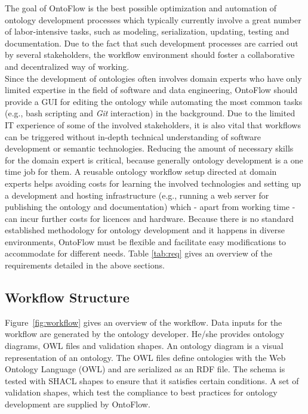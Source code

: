 \documentclass[runningheads]{llncs}
\begin{document}
The goal of OntoFlow is the best possible optimization and automation of ontology development processes which typically currently involve a great number of labor-intensive tasks, such as modeling, serialization, updating, testing and documentation. Due to the fact that such development processes are carried out by several stakeholders, the workflow environment should foster a collaborative and decentralized way of working.\\
Since the development of ontologies often involves domain experts who have only limited expertise in the field of software and data engineering, OntoFlow should provide a GUI for editing the ontology while automating the most common tasks (e.g., bash scripting and \textit{Git} interaction) in the background. Due to the limited IT experience of some of the involved stakeholders, it is also vital that workflows can be triggered without in-depth technical understanding of software development or semantic technologies. Reducing the amount of necessary skills for the domain expert is critical, because generally ontology development is a one time job for them. A reusable ontology workflow setup directed at domain experts helps avoiding costs for learning the involved technologies and setting up a development and hosting infrastructure (e.g., running a web server for publishing the ontology and documentation) which - apart from working time - can incur further costs for licences and hardware. Because there is no standard established methodology for ontology development and it happens in diverse environments, OntoFlow must be flexible and facilitate easy modifications to accommodate for different needs. Table \ref{tab:req} gives an overview of the requirements detailed in the above sections.

\subsection{Workflow Structure}
Figure~\ref{fig:workflow} gives an overview of the workflow. Data inputs for the workflow are generated by the ontology developer. He/she provides ontology diagrams, OWL files and validation shapes. An ontology diagram is a visual representation of an ontology. The OWL files define ontologies with the Web Ontology Language (OWL) and are serialized as an RDF file. The schema is tested with SHACL shapes to ensure that it satisfies certain conditions. A set of validation shapes, which test the compliance to best practices for ontology development are supplied by OntoFlow.
\end{document}
